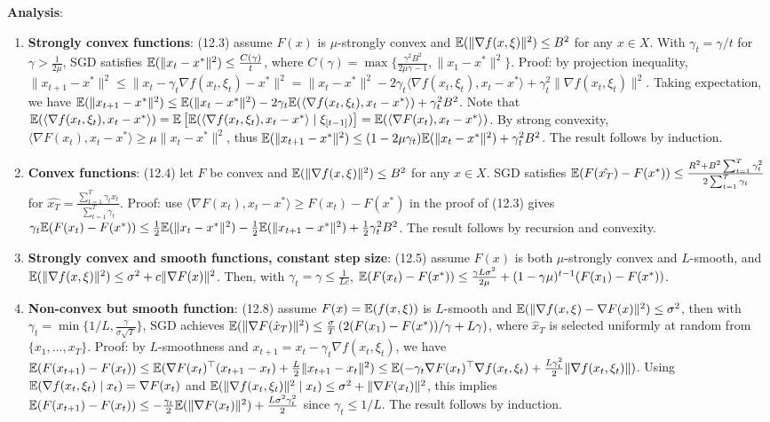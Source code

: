\textbf{Analysis}:
\begin{enumerate}
    \item \textbf{Strongly convex functions}: (12.3) assume $F(x)$ is $\mu$-strongly convex and $\mathbb{E}(\|\nabla f(x, \xi)\|^2) \le B^2$ for any $x \in X$. With $\gamma_t = \gamma / t$ for $\gamma > \frac{1}{2\mu}$, SGD satisfies $\mathbb{E}(\|x_t - x^*\|^2) \le \frac{C(\gamma)}{t}$, where $C(\gamma) = \max \{\frac{\gamma^2 B^2}{2\mu\gamma -1}, \|x_1 - x^*\|^2\}$. Proof: by projection inequality, $\|x_{t+1} - x^*\|^2 \le \|x_t - \gamma_t \nabla f(x_t, \xi_t) - x^*\|^2 = \|x_t - x^*\|^2 - 2\gamma_t \langle \nabla f(x_t, \xi_t), x_t - x^* \rangle + \gamma_t^2 \|\nabla f(x_t, \xi_t)\|^2$. Taking expectation, we have $\mathbb{E}(\|x_{t+1} - x^*\|^2) \le \mathbb{E}(\|x_t - x^*\|^2) - 2\gamma_t \mathbb{E}(\langle \nabla f(x_t, \xi_t), x_t - x^*\rangle) + \gamma_t^2 B^2$. Note that  $\mathbb{E}(\langle \nabla f(x_t, \xi_t), x_t - x^*\rangle) = \mathbb{E}\left[\mathbb{E}(\langle\nabla f(x_t, \xi_t), x_t-x^*\rangle \mid \xi_{[t-1]})\right] = \mathbb{E}(\langle \nabla F(x_t), x_t - x^*\rangle)$. By strong convexity, $\langle \nabla F(x_t), x_t - x^* \rangle \ge \mu \|x_t - x^*\|^2$, thus $\mathbb{E}(\|x_{t+1} - x^*\|^2) \le (1-2\mu \gamma_t)\mathbb{E}(\|x_t - x^*\|^2) + \gamma_t^2 B^2$. The result follows by induction.
    \item \textbf{Convex functions}: (12.4) let $F$ be convex and $\mathbb{E}(\|\nabla f(x, \xi)\|^2) \le B^2$ for any $x \in X$. SGD satisfies $\mathbb{E}(F(\hat{x_T}) - F(x^*)) \le \frac{R^2 + B^2 \sum_{t=1}^T \gamma_t^2}{2\sum_{t=1}^T \gamma_t}$ for $\hat{x_T} = \frac{\sum_{t=1}^T \gamma_t x_t}{\sum_{t=1}^T \gamma_t}$. Proof: use $\langle \nabla F(x_t), x_t - x^* \rangle \ge F(x_t) - F(x^*)$ in the proof of (12.3) gives $\gamma_t \mathbb{E}(F(x_t) - F(x^*)) \le \frac{1}{2}\mathbb{E}(\|x_t -x^*\|^2) - \frac{1}{2}\mathbb{E}(\|x_{t+1} - x^*\|^2) + \frac{1}{2}\gamma_t^2 B^2$. The result follows by recursion and convexity.
    \item \textbf{Strongly convex and smooth functions, constant step size}: (12.5) assume $F(x)$ is both $\mu$-strongly convex and $L$-smooth, and $\mathbb{E}(\|\nabla f(x, \xi)\|^2) \le \sigma^2 + c\|\nabla F(x)\|^2$. Then, with $\gamma_t = \gamma \le \frac{1}{Lc}$, $\mathbb{E}(F(x_t) - F(x^*)) \le \frac{\gamma L \sigma^2}{2\mu} + (1-\gamma \mu)^{t-1}(F(x_1) - F(x^*))$.
    \item \textbf{Non-convex but smooth function}: (12.8) assume $F(x) = \mathbb{E}(f(x, \xi))$ is $L$-smooth and $\mathbb{E}(\|\nabla f(x, \xi) - \nabla F(x)\|^2) \le \sigma^2$, then with $\gamma_t = \min\{1/L, \frac{\gamma}{\sigma\sqrt{T}}\}$, SGD achieves $\mathbb{E}(\|\nabla F(\hat{x}_T)\|^2) \le \frac{\sigma}{T}\left(2(F(x_1) - F(x^*))/\gamma + L\gamma\right)$, where $\hat{x}_T$ is selected uniformly at random from $\{x_1, \dots, x_T\}$. Proof: by $L$-smoothness and $x_{t+1}=x_t-\gamma_t \nabla f(x_t, \xi_t)$, we have $\mathbb{E}(F(x_{t+1}) - F(x_t)) \le \mathbb{E}(\nabla F(x_t)^\top (x_{t+1} - x_t) + \frac{L}{2}\|x_{t+1} - x_t\|^2) \le \mathbb{E}(-\gamma_t \nabla F(x_t)^\top \nabla f(x_t, \xi_t) + \frac{L\gamma_t^2}{2}\|\nabla f(x_t, \xi_t)\|)$. Using $\mathbb{E}(\nabla f(x_t, \xi_t) \mid x_t) = \nabla F(x_t)$ and $\mathbb{E}(\|\nabla f(x_t, \xi_t)\|^2 \mid x_t) \le \sigma^2 + \|\nabla F(x_t)\|^2$, this implies $\mathbb{E}(F(x_{t+1}) - F(x_t)) \le -\frac{\gamma_t}{2}\mathbb{E}(\|\nabla F(x_t)\|^2) + \frac{L\sigma^2\gamma_t^2}{2}$ since $\gamma_t \le 1/L$. The result follows by induction.

\end{enumerate}

